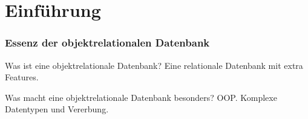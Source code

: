 \section{Einführung}

\begin{frame}
    \frametitle{Essenz der objektrelationalen Datenbank}


    \begin{block}{Was ist eine objektrelationale Datenbank?}
        \pause
        Eine relationale Datenbank mit extra Features.
    \end{block}

    \pause

    \begin{block}{Was macht eine objektrelationale Datenbank besonders?}
        \pause
        OOP. Komplexe Datentypen und Vererbung.
    \end{block}

\end{frame}
